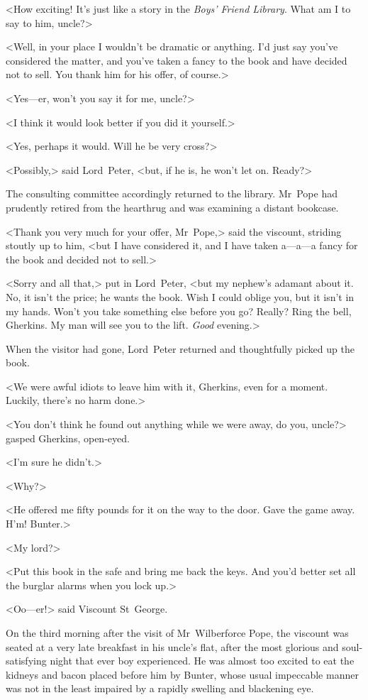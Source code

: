 <How exciting! It's just like a story in the \textit{Boys' Friend Library}. What am I to say to him, uncle?>

<Well, in your place I wouldn't be dramatic or anything. I'd just say you've considered the matter, and you've taken a fancy to the book and have decided not to sell. You thank him for his offer, of course.>

<Yes—er, won't you say it for me, uncle?>

<I think it would look better if you did it yourself.>

<Yes, perhaps it would. Will he be very cross?>

<Possibly,> said Lord~Peter, <but, if he is, he won't let on. Ready?>

The consulting committee accordingly returned to the library. Mr~Pope had prudently retired from the hearthrug and was examining a distant bookcase.

<Thank you very much for your offer, Mr~Pope,> said the viscount, striding stoutly up to him, <but I have considered it, and I have taken a—a—a fancy for the book and decided not to sell.>

<Sorry and all that,> put in Lord~Peter, <but my nephew's adamant about it. No, it isn't the price; he wants the book. Wish I could oblige you, but it isn't in my hands. Won't you take something else before you go? Really? Ring the bell, Gherkins. My man will see you to the lift. \textit{Good} evening.>

When the visitor had gone, Lord~Peter returned and thoughtfully picked up the book.

<We were awful idiots to leave him with it, Gherkins, even for a moment. Luckily, there's no harm done.>

<You don't think he found out anything while we were away, do you, uncle?> gasped Gherkins, open-eyed.

<I'm sure he didn't.>

<Why?>

<He offered me fifty pounds for it on the way to the door. Gave the game away. H'm! Bunter.>

<My lord?>

<Put this book in the safe and bring me back the keys. And you'd better set all the burglar alarms when you lock up.>

<Oo—er!> said Viscount St~George.

\divider
On the third morning after the visit of Mr~Wilberforce Pope, the viscount was seated at a very late breakfast in his uncle's flat, after the most glorious and soul-satisfying night that ever boy experienced. He was almost too excited to eat the kidneys and bacon placed before him by Bunter, whose usual impeccable manner was not in the least impaired by a rapidly swelling and blackening eye.

